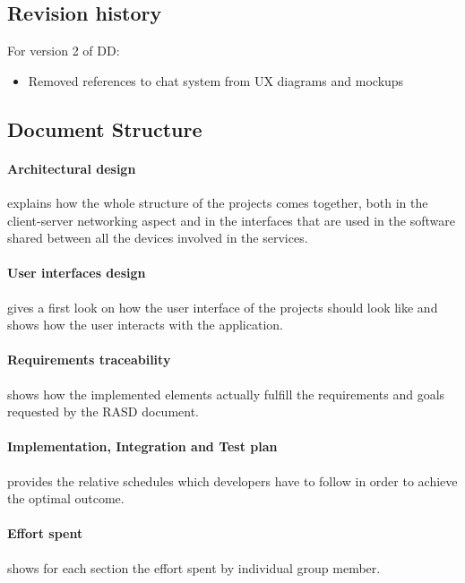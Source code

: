 {\color{secblue}\subsection{Revision history}}
For version 2 of DD:
\begin{itemize}
\item Removed references to chat system from UX diagrams and mockups
\end{itemize}

{\color{secblue}\subsection{Document Structure}}
\paragraph{Architectural design} explains how the whole structure of the projects comes together, both in the client-server networking aspect and in the interfaces that are used in the software shared between all the devices involved in the services.
\paragraph{User interfaces design} gives a first look on how the user interface of the projects should look like and shows how the user interacts with the application.
\paragraph{Requirements traceability} shows how the implemented elements actually fulfill the requirements and goals requested by the RASD document.
\paragraph{Implementation, Integration and Test plan} provides the relative schedules which developers have to follow in order to achieve the optimal outcome.
\paragraph{Effort spent} shows for each section the effort spent by individual group member.